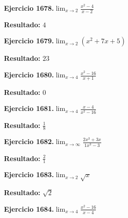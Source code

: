 \documentclass[10pt,a4paper]{article}
\begin{document}
\newpage
\begin{ejbox}
\textbf{Ejercicio 1678.}\quad $\lim_{x\to 2} \frac{x^2-4}{x-2}$
\end{ejbox}

\begin{solbox}
\textbf{Resultado:} \(\displaystyle 4\)
\end{solbox}

\begin{ejbox}
\textbf{Ejercicio 1679.}\quad $\lim_{x\to 2} (x^2 +7x +5)$
\end{ejbox}

\begin{solbox}
\textbf{Resultado:} \(\displaystyle 23\)
\end{solbox}

\begin{ejbox}
\textbf{Ejercicio 1680.}\quad $\lim_{x\to 4} \frac{x^2-16}{x+1}$
\end{ejbox}

\begin{solbox}
\textbf{Resultado:} \(\displaystyle 0\)
\end{solbox}

\newpage
\begin{ejbox}
\textbf{Ejercicio 1681.}\quad $\lim_{x\to 4} \frac{x-4}{x^2-16}$
\end{ejbox}

\begin{solbox}
\textbf{Resultado:} \(\displaystyle \frac{1}{8}\)
\end{solbox}

\begin{ejbox}
\textbf{Ejercicio 1682.}\quad $\lim_{x\to \infty} \frac{2x^3 + 3x}{1x^3 - 3}$
\end{ejbox}

\begin{solbox}
\textbf{Resultado:} \(\displaystyle \frac{2}{1}\)
\end{solbox}

\begin{ejbox}
\textbf{Ejercicio 1683.}\quad $\lim_{x\to 2} \sqrt{x}$
\end{ejbox}

\begin{solbox}
\textbf{Resultado:} \(\displaystyle \sqrt{2}\)
\end{solbox}

\newpage
\begin{ejbox}
\textbf{Ejercicio 1684.}\quad $\lim_{x\to 4} \frac{x^2-16}{x-4}$
\end{ejbox}
\end{document}
